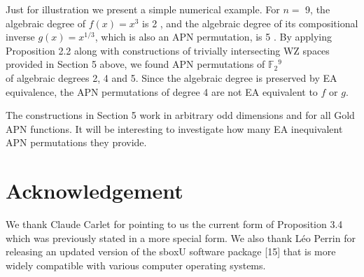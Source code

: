 \documentclass[10pt]{article}
\begin{document}
Just for illustration we present a simple numerical example. For $n=$ 9, the algebraic degree of $f(x)=x^{3}$ is 2 , and the algebraic degree of its compositional inverse $g(x)=x^{1 / 3}$, which is also an APN permutation, is 5 . By applying Proposition 2.2 along with constructions of trivially intersecting WZ spaces provided in Section 5 above, we found APN permutations of $\mathbb{F}_{2}{ }^{9}$\\
of algebraic degrees 2, 4 and 5. Since the algebraic degree is preserved by EA equivalence, the APN permutations of degree 4 are not EA equivalent to $f$ or $g$.

The constructions in Section 5 work in arbitrary odd dimensions and for all Gold APN functions. It will be interesting to investigate how many EA inequivalent APN permutations they provide.

\section*{Acknowledgement}
We thank Claude Carlet for pointing to us the current form of Proposition 3.4 which was previously stated in a more special form. We also thank Léo Perrin for releasing an updated version of the sboxU software package [15] that is more widely compatible with various computer operating systems.
\end{document}
